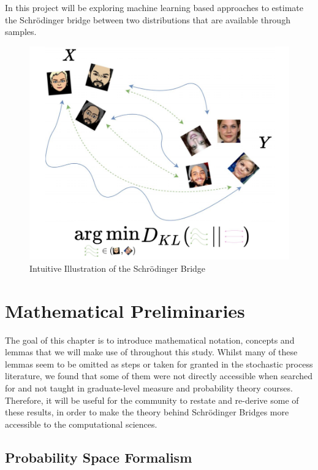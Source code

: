 \documentclass[a4paper,12pt,twoside,openright]{report}
\theoremstyle{definition}
\begin{document}
 In this project will be exploring machine learning based approaches to estimate the Schrödinger bridge between two distributions that are available through samples.
\begin{figure}
    \centering
    \includegraphics[scale=0.7]{images/charicaturistic_bridge.PNG}
    \caption{Intuitive Illustration of the Schrödinger Bridge}
    \label{fig:intuitive_bridge}
\end{figure}

 
\chapter{Mathematical Preliminaries}

\setcounter{page}{1}

The goal of this chapter is to introduce mathematical notation, concepts and lemmas that we will make use of throughout this study. Whilst many of these lemmas seem to be omitted as steps or taken for granted in the stochastic process literature, we found that some of them were not directly accessible when searched for and not taught in graduate-level measure and probability theory courses. Therefore, it will be useful for the community to restate and re-derive some of these results, in order to make the theory behind Schrödinger Bridges more accessible to the computational sciences.
\section{Probability Space Formalism}
\end{document}
